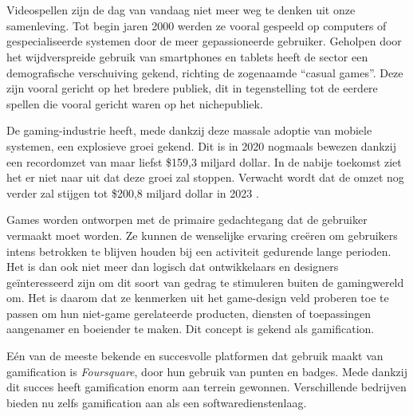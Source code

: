 
\chapter{}
\label{ch:inleiding}

Videospellen zijn de dag van vandaag niet meer weg te denken uit onze samenleving. Tot begin jaren 2000 werden ze vooral gespeeld op computers of gespecialiseerde systemen door de meer gepassioneerde gebruiker. Geholpen door het wijdverspreide gebruik van smartphones en tablets heeft de sector een demografische verschuiving gekend, richting de zogenaamde ``casual games''. Deze zijn vooral gericht op het bredere publiek, dit in tegenstelling tot de eerdere spellen die vooral gericht waren op het nichepubliek.

De gaming-industrie heeft, mede dankzij deze massale adoptie van mobiele systemen, een explosieve groei gekend. Dit is in 2020 nogmaals bewezen dankzij een recordomzet van maar liefst \$159,3 miljard dollar. In de nabije toekomst ziet het er niet naar uit dat deze groei zal stoppen. Verwacht wordt dat de omzet nog verder zal stijgen tot \$200,8 miljard dollar in 2023 \autocite{WePC2021}.

Games worden ontworpen met de primaire gedachtegang dat de gebruiker vermaakt moet worden. Ze kunnen de wenselijke ervaring creëren om gebruikers intens betrokken te blijven houden bij een activiteit gedurende lange perioden. Het is dan ook niet meer dan logisch dat ontwikkelaars en designers geïnteresseerd zijn om dit soort van gedrag te stimuleren buiten de gamingwereld om. Het is daarom dat ze kenmerken uit het game-design veld proberen toe te passen om hun niet-game gerelateerde producten, diensten of toepassingen aangenamer en boeiender te maken. Dit concept is gekend als gamification.

Eén van de meeste bekende en succesvolle platformen dat gebruik maakt van gamification is \textit{Foursquare}, door hun gebruik van punten en badges. Mede dankzij dit succes heeft gamification enorm aan terrein gewonnen. Verschillende bedrijven bieden nu zelfs gamification aan als een softwaredienstenlaag.


\section{}
\label{sec:probleemstelling}

